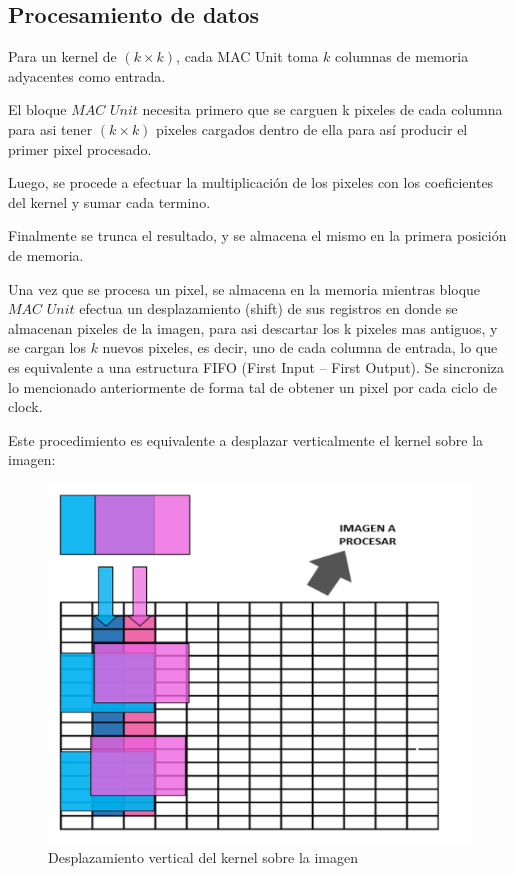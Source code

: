\subsection{Procesamiento de datos}  \label{processing_subsecc}
Para un kernel de  $(k \times k)$, cada MAC Unit toma $k$ columnas de memoria
adyacentes como entrada.

El bloque $MAC$  $Unit$ necesita primero que se carguen k pixeles de cada
columna para asi tener $(k \times k)$ pixeles cargados dentro de ella para así
producir el primer pixel procesado.

Luego, se procede a efectuar la multiplicación de los pixeles con los coeficientes del kernel y sumar cada termino.

Finalmente se trunca el resultado, y se almacena el mismo en la primera posición de memoria.

Una vez que se procesa un pixel, se almacena en la memoria mientras bloque $MAC$  $Unit$ efectua un desplazamiento (shift) de sus registros en donde se almacenan pixeles de la imagen, para asi descartar los k pixeles mas antiguos,
 y se cargan los $k$ nuevos pixeles, es decir, uno de cada columna de entrada, lo que es equivalente a una estructura FIFO (First Input – First Output).
Se sincroniza lo mencionado anteriormente de forma tal de obtener un pixel por cada ciclo de clock.

Este procedimiento es equivalente a desplazar verticalmente el kernel sobre la imagen:

\begin{figure}
\centering
\includegraphics[scale=0.7]{conv1_despl.png}
\caption{Desplazamiento vertical del kernel sobre la imagen }
\label{verticaldesp}
\end{figure}


